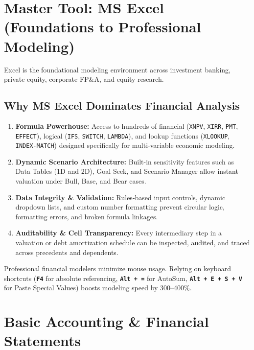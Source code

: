 \documentclass[11pt,a4paper]{article}
\newcommand{\key}[1]{\texttt{\colorbox{black!8}{\textbf{#1}}}}
\begin{document}
\section{Master Tool: MS Excel (Foundations to Professional Modeling)}
\label{sec:excel-mastery}

Excel is the foundational modeling environment across investment banking, private equity, corporate FP\&A, and equity research.

\subsection{Why MS Excel Dominates Financial Analysis}

\begin{enumerate}
  \item \textbf{Formula Powerhouse:} Access to hundreds of financial (\texttt{XNPV}, \texttt{XIRR}, \texttt{PMT}, \texttt{EFFECT}), logical (\texttt{IFS}, \texttt{SWITCH}, \texttt{LAMBDA}), and lookup functions (\texttt{XLOOKUP}, \texttt{INDEX-MATCH}) designed specifically for multi-variable economic modeling.
  \item \textbf{Dynamic Scenario Architecture:} Built-in sensitivity features such as Data Tables (1D and 2D), Goal Seek, and Scenario Manager allow instant valuation under Bull, Base, and Bear cases.
  \item \textbf{Data Integrity \& Validation:} Rules-based input controls, dynamic dropdown lists, and custom number formatting prevent circular logic, formatting errors, and broken formula linkages.
  \item \textbf{Auditability \& Cell Transparency:} Every intermediary step in a valuation or debt amortization schedule can be inspected, audited, and traced across precedents and dependents.
\end{enumerate}

\begin{protip}
Professional financial modelers minimize mouse usage. Relying on keyboard shortcuts (\key{F4} for absolute referencing, \key{Alt + =} for AutoSum, \key{Alt + E + S + V} for Paste Special Values) boosts modeling speed by 300--400\%.
\end{protip}

\section{Basic Accounting \& Financial Statements}
\label{sec:accounting-statements}
\end{document}

